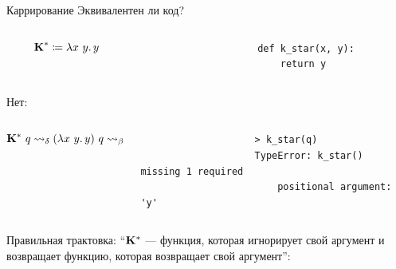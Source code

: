
    \begin{frame}[fragile]{Каррирование}
        \vspace{-0.5em}
        Эквивалентен ли код?
        \vspace{-1em}
        \begin{columns}[onlytextwidth]
            \begin{column}[t]{0.485\textwidth}
                \vspace{0.2 em}
                \[\textbf{K}^* \coloneqq \lambda x~y\ldotp y\]
            \end{column}\hfill%
            \begin{column}[t]{0.485\textwidth}
                \begin{verbatim}
                    def k_star(x, y):
                        return y
                \end{verbatim}
            \end{column}
        \end{columns}
        \pause
        Нет:
        \vspace{-2em}
        \begin{columns}[onlytextwidth]
            \begin{column}[t]{0.485\textwidth}
                \vspace{0.5em}
                \[\mathbf{K}^* ~ q \rightsquigarrow_\delta (\lambda x~y\ldotp y) ~ q \rightsquigarrow_\beta \lambda y\ldotp y \]
            \end{column}\hfill%
            \begin{column}[t]{0.485\textwidth}
                \begin{verbatim}
                    > k_star(q)
                    TypeError: k_star() missing 1 required
                        positional argument: 'y'
                \end{verbatim}
            \end{column}
        \end{columns}
        \pause
        \vspace{0.3em}
        Правильная трактовка: ``$\mathbf{K}^*$ --- функция, которая игнорирует свой аргумент и возвращает
        функцию, которая возвращает свой аргумент'':
        \vspace{-1.5em}
        \begin{columns}[onlytextwidth]
            \begin{column}[t]{0.485\textwidth}

\end{column}
\end{columns}
\end{frame}
